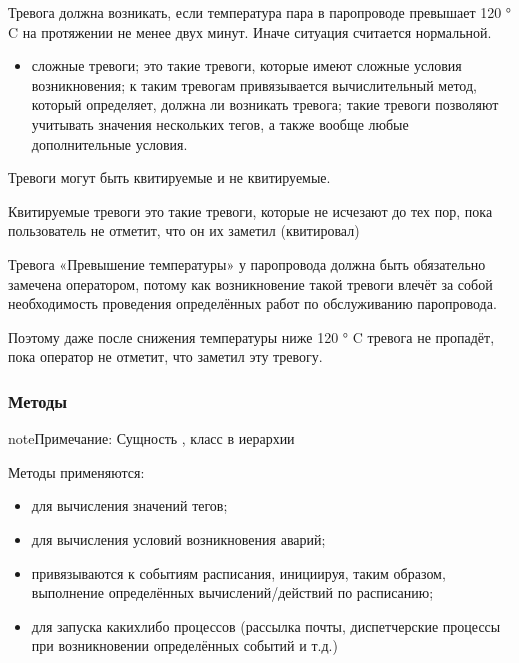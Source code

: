 \documentclass[a4paper,10pt,russian]{sphinxmanual}
\begin{document}
\sphinxAtStartPar
{}
Тревога должна возникать, если температура пара в паропроводе превышает
120 ° C на протяжении не менее двух минут. Иначе ситуация считается
нормальной.


\begin{itemize}
\item {}
\sphinxAtStartPar
сложные тревоги;
это такие тревоги, которые имеют сложные условия возникновения; к таким
тревогам привязывается вычислительный метод, который определяет, должна ли
возникать тревога; такие тревоги позволяют учитывать значения нескольких
тегов, а также вообще любые дополнительные условия.

\end{itemize}

\sphinxAtStartPar
Тревоги могут быть квитируемые и не квитируемые.

\sphinxAtStartPar
Квитируемые тревоги \sphinxhyphen{} это такие тревоги, которые не исчезают до тех пор, пока
пользователь не отметит, что он их заметил (квитировал)



\sphinxAtStartPar
{}
Тревога «Превышение температуры» у паропровода должна быть обязательно замечена
оператором, потому как возникновение такой тревоги влечёт за собой
необходимость проведения определённых работ по обслуживанию паропровода.

\sphinxAtStartPar
Поэтому даже после снижения температуры ниже 120 ° C тревога не пропадёт,
пока оператор не отметит, что заметил эту тревогу.




\subsubsection{Методы}
\label{\detokenize{architecture:id9}}
\begin{sphinxadmonition}{note}{Примечание:}
\sphinxAtStartPar
Сущность , класс в иерархии 
\end{sphinxadmonition}

\sphinxAtStartPar
Методы применяются:
\begin{itemize}
\item {}
\sphinxAtStartPar
для вычисления значений тегов;

\item {}
\sphinxAtStartPar
для вычисления условий возникновения аварий;

\item {}
\sphinxAtStartPar
привязываются к событиям расписания, инициируя, таким образом, выполнение
определённых вычислений/действий по расписанию;

\item {}
\sphinxAtStartPar
для запуска каких\sphinxhyphen{}либо процессов (рассылка почты, диспетчерские процессы
при возникновении определённых событий и т.д.)

\end{itemize}
\end{document}
